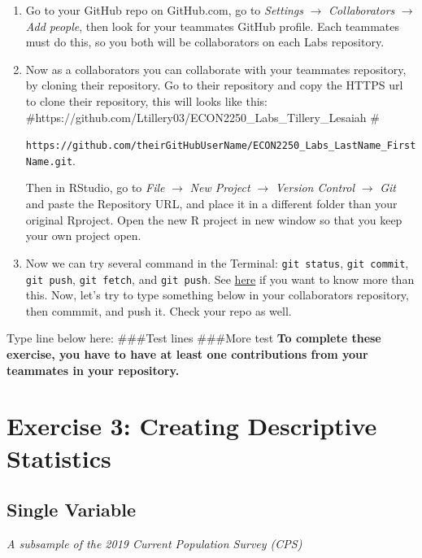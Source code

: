 \documentclass[
  letterpaper,
  DIV=11,
  numbers=noendperiod]{scrartcl}
\begin{document}
\begin{enumerate}
\def\labelenumi{\arabic{enumi}.}
\item
  Go to your GitHub repo on GitHub.com, go to \emph{Settings}
  \(\rightarrow\) \emph{Collaborators} \(\rightarrow\) \emph{Add
  people}, then look for your teammates GitHub profile. Each teammates
  must do this, so you both will be collaborators on each Labs
  repository.
\item
  Now as a collaborators you can collaborate with your teammates
  repository, by cloning their repository. Go to their repository and
  copy the HTTPS url to clone their repository, this will looks like
  this: \#https://github.com/Ltillery03/ECON2250\_Labs\_Tillery\_Lesaiah
  \#

  \texttt{https://github.com/theirGitHubUserName/ECON2250\_Labs\_LastName\_FirstName.git}.

  Then in RStudio, go to \emph{File} \(\rightarrow\) \emph{New Project}
  \(\rightarrow\) \emph{Version Control} \(\rightarrow\) \emph{Git} and
  paste the Repository URL, and place it in a different folder than your
  original Rproject. Open the new R project in new window so that you
  keep your own project open.
\item
  Now we can try several command in the Terminal: \texttt{git\ status},
  \texttt{git\ commit}, \texttt{git\ push}, \texttt{git\ fetch}, and
  \texttt{git\ push}. See
  \href{https://rviews.rstudio.com/2020/04/23/10-commands-to-get-started-with-git/}{here}
  if you want to know more than this. Now, let's try to type something
  below in your collaborators repository, then commmit, and push it.
  Check your repo as well.
\end{enumerate}

Type line below here: \#\#\#Test lines \#\#\#More test \textbf{To
complete these exercise, you have to have at least one contributions
from your teammates in your repository.}

\section{Exercise 3: Creating Descriptive
Statistics}\label{exercise-3-creating-descriptive-statistics}

\subsection{Single Variable}\label{single-variable}

\emph{A subsample of the 2019 Current Population Survey (CPS)}
\end{document}
